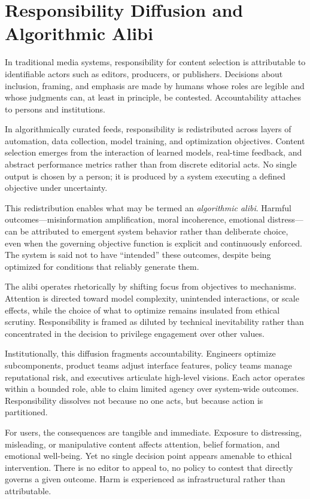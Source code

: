 \documentclass[12pt]{article}
\begin{document}
\section{Responsibility Diffusion and Algorithmic Alibi}

In traditional media systems, responsibility for content selection is attributable to identifiable actors such as editors, producers, or publishers. Decisions about inclusion, framing, and emphasis are made by humans whose roles are legible and whose judgments can, at least in principle, be contested. Accountability attaches to persons and institutions.

In algorithmically curated feeds, responsibility is redistributed across layers of automation, data collection, model training, and optimization objectives. Content selection emerges from the interaction of learned models, real-time feedback, and abstract performance metrics rather than from discrete editorial acts. No single output is chosen by a person; it is produced by a system executing a defined objective under uncertainty.

This redistribution enables what may be termed an \emph{algorithmic alibi}. Harmful outcomes—misinformation amplification, moral incoherence, emotional distress—can be attributed to emergent system behavior rather than deliberate choice, even when the governing objective function is explicit and continuously enforced. The system is said not to have ``intended'' these outcomes, despite being optimized for conditions that reliably generate them.

The alibi operates rhetorically by shifting focus from objectives to mechanisms. Attention is directed toward model complexity, unintended interactions, or scale effects, while the choice of what to optimize remains insulated from ethical scrutiny. Responsibility is framed as diluted by technical inevitability rather than concentrated in the decision to privilege engagement over other values.

Institutionally, this diffusion fragments accountability. Engineers optimize subcomponents, product teams adjust interface features, policy teams manage reputational risk, and executives articulate high-level visions. Each actor operates within a bounded role, able to claim limited agency over system-wide outcomes. Responsibility dissolves not because no one acts, but because action is partitioned.

For users, the consequences are tangible and immediate. Exposure to distressing, misleading, or manipulative content affects attention, belief formation, and emotional well-being. Yet no single decision point appears amenable to ethical intervention. There is no editor to appeal to, no policy to contest that directly governs a given outcome. Harm is experienced as infrastructural rather than attributable.
\end{document}
